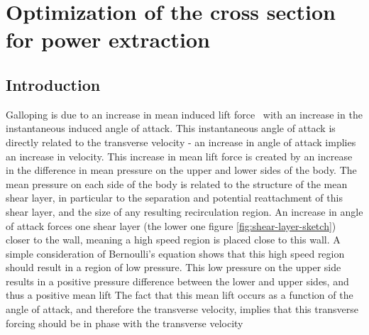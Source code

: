 \chapter{Optimization of the cross section for power extraction}

\section{Introduction}



 Galloping is due to an increase in mean induced lift force \cy\  with an increase in the instantaneous induced angle of attack. This instantaneous angle of attack is directly related to the transverse velocity - an increase in angle of attack implies an increase in velocity. This increase in mean lift force is created by an increase in the difference in mean pressure on the upper and lower sides of the body. The mean pressure on each side of the body is related to the structure of the mean shear layer, in particular to the separation and potential reattachment of this shear layer, and the size of any resulting recirculation region. An increase in angle of attack forces one shear layer (the lower one figure \ref{fig:shear-layer-sketch}) closer to the wall, meaning a high speed region is placed close to this wall. A simple consideration of Bernoulli's equation shows that this high speed region should result in a region of low pressure. This low pressure on the upper side results in a positive pressure difference between the lower and upper sides, and thus a positive mean lift The fact that this mean lift occurs as a function of the angle of attack, and therefore the transverse velocity, implies that this transverse forcing should be in phase with the transverse velocity

